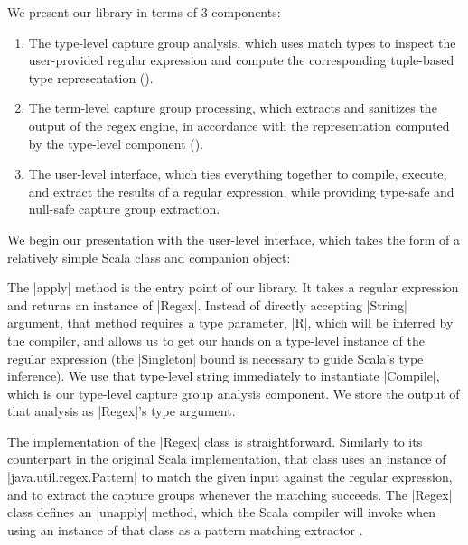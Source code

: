 We present our library in terms of 3 components:

\begin{enumerate}
  \item The type-level capture group analysis, which uses match types to inspect the user-provided regular expression and compute the corresponding tuple-based type representation ().

  \item The term-level capture group processing, which extracts and sanitizes the output of the regex engine, in accordance with the representation computed by the type-level component ().

  \item The user-level interface, which ties everything together to compile, execute, and extract the results of a regular expression, while providing type-safe and null-safe capture group extraction.
\end{enumerate}

We begin our presentation with the user-level interface, which takes the form of a relatively simple Scala class and companion object:

\regexUserLevel
%

The |apply| method is the entry point of our library.
It takes a regular expression and returns an instance of |Regex|.
Instead of directly accepting |String| argument, that method requires a type parameter, |R|, which will be inferred by the compiler, and allows us to get our hands on a type-level instance of the regular expression (the |Singleton| bound is necessary to guide Scala's type inference).
We use that type-level string immediately to instantiate |Compile|, which is our type-level capture group analysis component.
We store the output of that analysis as |Regex|'s type argument.

The implementation of the |Regex| class is straightforward.
Similarly to its counterpart in the original Scala implementation, that class uses an instance of |java.util.regex.Pattern| to match the given input against the regular expression, and to extract the capture groups whenever the matching succeeds.
The |Regex| class defines an |unapply| method, which the Scala compiler will invoke when using an instance of that class as a pattern matching extractor \citep{emir2007matching}.

